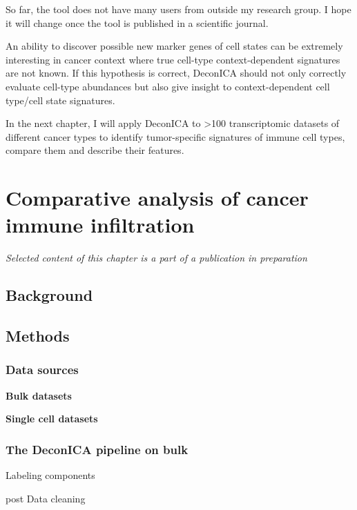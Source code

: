 \documentclass[12pt,]{book}
\theoremstyle{definition}
\theoremstyle{definition}
\theoremstyle{definition}
\theoremstyle{remark}
\begin{document}
So far, the tool does not have many users from outside my research
group. I hope it will change once the tool is published in a scientific
journal.

An ability to discover possible new marker genes of cell states can be
extremely interesting in cancer context where true cell-type
context-dependent signatures are not known. If this hypothesis is
correct, DeconICA should not only correctly evaluate cell-type
abundances but also give insight to context-dependent cell type/cell
state signatures.

In the next chapter, I will apply DeconICA to \textgreater{}100
transcriptomic datasets of different cancer types to identify
tumor-specific signatures of immune cell types, compare them and
describe their features.

\hypertarget{results}{%
\chapter{Comparative analysis of cancer immune
infiltration}\label{results}}

\emph{Selected content of this chapter is a part of a publication in
preparation}

\hypertarget{background}{%
\section{Background}\label{background}}

\hypertarget{methods-1}{%
\section{Methods}\label{methods-1}}

\hypertarget{data-sources}{%
\subsection{Data sources}\label{data-sources}}

\textbf{Bulk datasets}

\textbf{Single cell datasets}

\hypertarget{the-deconica-pipeline-on-bulk}{%
\subsection{The DeconICA pipeline on
bulk}\label{the-deconica-pipeline-on-bulk}}

Labeling components

post Data cleaning
\end{document}
